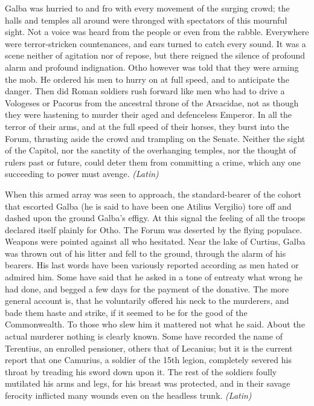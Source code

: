 
Galba was hurried to and fro with every movement of the surging crowd; the halls and temples all around were thronged with spectators of this mournful sight. Not a voice was heard from the people or even from the rabble. Everywhere were terror-stricken countenances, and ears turned to catch every sound. It was a scene neither of agitation nor of repose, but there reigned the silence of profound alarm and profound indignation. Otho however was told that they were arming the mob. He ordered his men to hurry on at full speed, and to anticipate the danger. Then did Roman soldiers rush forward like men who had to drive a Vologeses or Pacorus from the ancestral throne of the Arsacidae, not as though they were hastening to murder their aged and defenceless Emperor. In all the terror of their arms, and at the full speed of their horses, they burst into the Forum, thrusting aside the crowd and trampling on the Senate. Neither the sight of the Capitol, nor the sanctity of the overhanging temples, nor the thought of rulers past or future, could deter them from committing a crime, which any one succeeding to power must avenge. \emph{(Latin)}


When this armed array was seen to approach, the standard-bearer of the cohort that escorted Galba (he is said to have been one Atilius Vergilio) tore off and dashed upon the ground Galba's effigy. At this signal the feeling of all the troops declared itself plainly for Otho. The Forum was deserted by the flying populace. Weapons were pointed against all who hesitated. Near the lake of Curtius, Galba was thrown out of his litter and fell to the ground, through the alarm of his bearers. His last words have been variously reported according as men hated or admired him. Some have said that he asked in a tone of entreaty what wrong he had done, and begged a few days for the payment of the donative. The more general account is, that he voluntarily offered his neck to the murderers, and bade them haste and strike, if it seemed to be for the good of the Commonwealth. To those who slew him it mattered not what he said. About the actual murderer nothing is clearly known. Some have recorded the name of Terentius, an enrolled pensioner, others that of Lecanius; but it is the current report that one Camurius, a soldier of the 15th legion, completely severed his throat by treading his sword down upon it. The rest of the soldiers foully mutilated his arms and legs, for his breast was protected, and in their savage ferocity inflicted many wounds even on the headless trunk. \emph{(Latin)}

